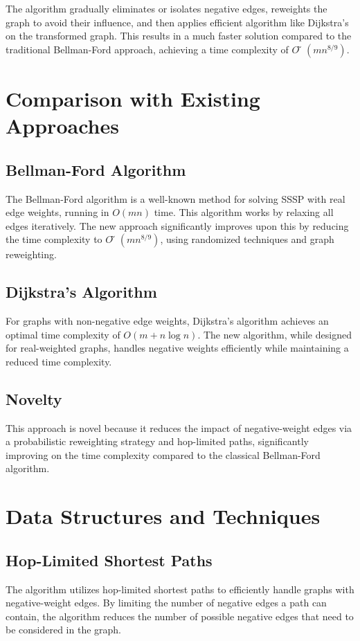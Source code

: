 \documentclass[12pt]{article}
\begin{document}
The algorithm gradually eliminates or isolates negative edges, reweights the graph to avoid their influence, and then applies efficient algorithm like Dijkstra’s on the transformed graph. This results in a much faster solution compared to the traditional Bellman-Ford approach, achieving a time complexity of \( Õ(mn^{8/9}) \).


\section*{Comparison with Existing Approaches}

\subsection*{Bellman-Ford Algorithm}
The Bellman-Ford algorithm is a well-known method for solving SSSP with real edge weights, running in \( O(mn) \) time. This algorithm works by relaxing all edges iteratively. The new approach significantly improves upon this by reducing the time complexity to \( Õ(mn^{8/9}) \), using randomized techniques and graph reweighting.

\subsection*{Dijkstra's Algorithm}
For graphs with non-negative edge weights, Dijkstra's algorithm achieves an optimal time complexity of \( O(m + n \log n) \). The new algorithm, while designed for real-weighted graphs, handles negative weights efficiently while maintaining a reduced time complexity.

\subsection*{Novelty}
This approach is novel because it reduces the impact of negative-weight edges via a probabilistic reweighting strategy and hop-limited paths, significantly improving on the time complexity compared to the classical Bellman-Ford algorithm.

\section*{Data Structures and Techniques}

\subsection*{Hop-Limited Shortest Paths}
The algorithm utilizes hop-limited shortest paths to efficiently handle graphs with negative-weight edges. By limiting the number of negative edges a path can contain, the algorithm reduces the number of possible negative edges that need to be considered in the graph.
\end{document}
